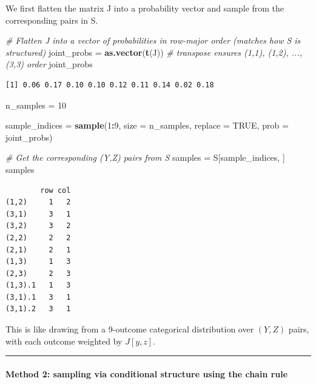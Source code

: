 \documentclass[
]{article}
\newenvironment{Shaded}{\begin{snugshade}}{\end{snugshade}}
\newcommand{\AttributeTok}[1]{\textcolor[rgb]{0.13,0.29,0.53}{#1}}
\newcommand{\CommentTok}[1]{\textcolor[rgb]{0.56,0.35,0.01}{\textit{#1}}}
\newcommand{\ConstantTok}[1]{\textcolor[rgb]{0.56,0.35,0.01}{#1}}
\newcommand{\DecValTok}[1]{\textcolor[rgb]{0.00,0.00,0.81}{#1}}
\newcommand{\FunctionTok}[1]{\textcolor[rgb]{0.13,0.29,0.53}{\textbf{#1}}}
\newcommand{\NormalTok}[1]{#1}
\newcommand{\OtherTok}[1]{\textcolor[rgb]{0.56,0.35,0.01}{#1}}
\newcommand{\SpecialCharTok}[1]{\textcolor[rgb]{0.81,0.36,0.00}{\textbf{#1}}}
\begin{document}
We first flatten the matrix J into a probability vector and sample from
the corresponding pairs in S.

\begin{Shaded}
\begin{Highlighting}[]
\CommentTok{\# Flatten J into a vector of probabilities in row{-}major order (matches how S is structured)}
\NormalTok{joint\_probs }\OtherTok{=} \FunctionTok{as.vector}\NormalTok{(}\FunctionTok{t}\NormalTok{(J))  }\CommentTok{\# transpose ensures (1,1), (1,2), ..., (3,3) order}
\NormalTok{joint\_probs}
\end{Highlighting}
\end{Shaded}

\begin{verbatim}
[1] 0.06 0.17 0.10 0.10 0.12 0.11 0.14 0.02 0.18
\end{verbatim}

\begin{Shaded}
\begin{Highlighting}[]
\NormalTok{n\_samples }\OtherTok{=} \DecValTok{10}

\NormalTok{sample\_indices }\OtherTok{=} \FunctionTok{sample}\NormalTok{(}\DecValTok{1}\SpecialCharTok{:}\DecValTok{9}\NormalTok{, }\AttributeTok{size =}\NormalTok{ n\_samples, }\AttributeTok{replace =} \ConstantTok{TRUE}\NormalTok{, }\AttributeTok{prob =}\NormalTok{ joint\_probs)}

\CommentTok{\# Get the corresponding (Y,Z) pairs from S}
\NormalTok{samples }\OtherTok{=}\NormalTok{ S[sample\_indices, ]}
\NormalTok{samples}
\end{Highlighting}
\end{Shaded}

\begin{verbatim}
        row col
(1,2)     1   2
(3,1)     3   1
(3,2)     3   2
(2,2)     2   2
(2,1)     2   1
(1,3)     1   3
(2,3)     2   3
(1,3).1   1   3
(3,1).1   3   1
(3,1).2   3   1
\end{verbatim}

This is like drawing from a 9-outcome categorical distribution over
\((Y,Z)\) pairs, with each outcome weighted by \(J[y,z]\).

\begin{center}\rule{0.5\linewidth}{0.5pt}\end{center}

\paragraph{\texorpdfstring{\textbf{Method 2: sampling via conditional
structure using the chain
rule}}{Method 2: sampling via conditional structure using the chain rule}}\label{method-2-sampling-via-conditional-structure-using-the-chain-rule}
\end{document}
